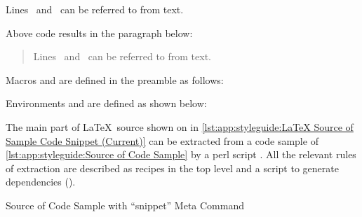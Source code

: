 \begin{VerbatimU}
\begin{fcvref}[ln:base1]
Lines~ and~ can be referred
to from text.
\end{fcvref}
\end{VerbatimU}

Above code results in the paragraph below:

\begin{quote}
\begin{fcvref}[ln:base1]
Lines~ and~ can be referred
to from text.
\end{fcvref}
\end{quote}

Macros \qco{\\lnlbl\{\}} and \qco{\\lnref\{\}} are defined in
the preamble as follows:

\begin{VerbatimU}
\newcommand{\lnlblbase}{}
\newcommand{\lnlbl}[1]{%
  \phantomsection\label{\lnlblbase:#1}}
\newcommand{\lnrefbase}{}
\newcommand{\lnref}[1]{\ref{\lnrefbase:#1}}
\end{VerbatimU}

Environments  and  are defined as
shown below:

\begin{VerbatimU}
\newenvironment{fcvlabel}[1][]{%
  \renewcommand{\lnlblbase}{#1}%
  \ignorespaces}{\ignorespacesafterend}
\newenvironment{fcvref}[1][]{%
  \renewcommand{\lnrefbase}{#1}%
  \ignorespaces}{\ignorespacesafterend}
\end{VerbatimU}

\begin{fcvref}
The main part of \LaTeX\ source shown on
 in
\cref{lst:app:styleguide:LaTeX Source of Sample Code Snippet (Current)}
can be extracted from a code sample of
\cref{lst:app:styleguide:Source of Code Sample} by a perl script
. All the relevant rules of extraction
are described as recipes in the top level  and
a script to generate dependencies ().
\end{fcvref}

\begin{listing*}[tb]
\vspace*{-9pt}
\caption{Source of Code Sample with ``snippet'' Meta Command}
\label{lst:app:styleguide:Source of Code Sample}
\end{listing*}

